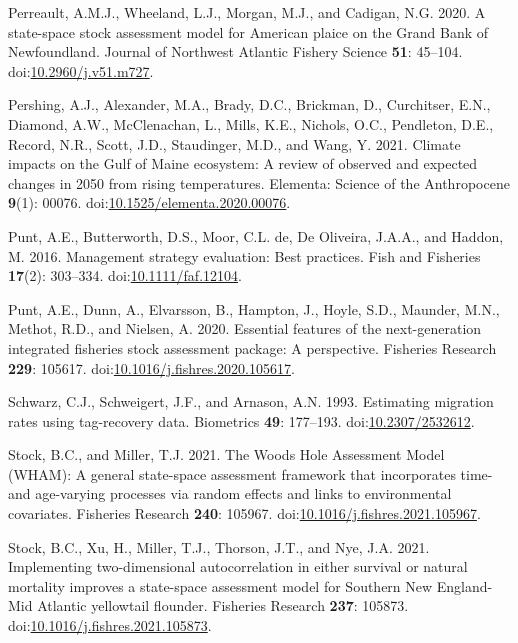 \begin{CSLReferences}{1}{0}
\leavevmode{}%
Perreault, A.M.J., Wheeland, L.J., Morgan, M.J., and Cadigan, N.G. 2020. A state-space stock assessment model for {American} plaice on the {Grand} {Bank} of {Newfoundland}. Journal of Northwest Atlantic Fishery Science \textbf{51}: 45--104. doi:\href{https://doi.org/10.2960/j.v51.m727}{10.2960/j.v51.m727}.

\leavevmode{}%
Pershing, A.J., Alexander, M.A., Brady, D.C., Brickman, D., Curchitser, E.N., Diamond, A.W., McClenachan, L., Mills, K.E., Nichols, O.C., Pendleton, D.E., Record, N.R., Scott, J.D., Staudinger, M.D., and Wang, Y. 2021. Climate impacts on the {G}ulf of {M}aine ecosystem: A review of observed and expected changes in 2050 from rising temperatures. Elementa: Science of the Anthropocene \textbf{9}(1): 00076. doi:\href{https://doi.org/10.1525/elementa.2020.00076}{10.1525/elementa.2020.00076}.

\leavevmode{}%
Punt, A.E., Butterworth, D.S., Moor, C.L. de, De Oliveira, J.A.A., and Haddon, M. 2016. Management strategy evaluation: Best practices. Fish and Fisheries \textbf{17}(2): 303--334. doi:\href{https://doi.org/10.1111/faf.12104}{10.1111/faf.12104}.

\leavevmode{}%
Punt, A.E., Dunn, A., Elvarsson, B., Hampton, J., Hoyle, S.D., Maunder, M.N., Methot, R.D., and Nielsen, A. 2020. Essential features of the next-generation integrated fisheries stock assessment package: A perspective. Fisheries Research \textbf{229}: 105617. doi:\href{https://doi.org/10.1016/j.fishres.2020.105617}{10.1016/j.fishres.2020.105617}.

\leavevmode{}%
Schwarz, C.J., Schweigert, J.F., and Arnason, A.N. 1993. Estimating migration rates using tag-recovery data. Biometrics \textbf{49}: 177--193. doi:\href{https://doi.org/10.2307/2532612}{10.2307/2532612}.

\leavevmode{}%
Stock, B.C., and Miller, T.J. 2021. The {Woods Hole Assessment Model} ({WHAM}): A general state-space assessment framework that incorporates time- and age-varying processes via random effects and links to environmental covariates. Fisheries Research \textbf{240}: 105967. doi:\href{https://doi.org/10.1016/j.fishres.2021.105967}{10.1016/j.fishres.2021.105967}.

\leavevmode{}%
Stock, B.C., Xu, H., Miller, T.J., Thorson, J.T., and Nye, J.A. 2021. Implementing two-dimensional autocorrelation in either survival or natural mortality improves a state-space assessment model for {Southern New England}-{Mid Atlantic} yellowtail flounder. Fisheries Research \textbf{237}: 105873. doi:\href{https://doi.org/10.1016/j.fishres.2021.105873}{10.1016/j.fishres.2021.105873}.


\end{CSLReferences}
